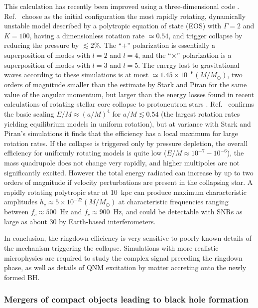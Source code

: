 \documentclass[]{iopart}
\begin{document}
This calculation has recently been improved using a three-dimensional code
\cite{Baiotti:2004wn,Baiotti:2005vi,Baiotti:2006wm,Baiotti:2007np}.
Ref.~\cite{Baiotti:2005vi} choose as the initial configuration the most
rapidly rotating, dynamically unstable model described by a polytropic
equation of state (EOS) with $\Gamma=2$ and $K=100$, having a dimensionless
rotation rate $\simeq 0.54$, and trigger collapse by reducing the pressure by
$\lesssim 2\%$. The ``$+$'' polarization is essentially a superposition of
modes with $l=2$ and $l=4$, and the ``$\times$'' polarization is a
superposition of modes with $l=3$ and $l=5$.  The energy lost to gravitational
waves according to these simulations is at most $\simeq 1.45\times 10^{-6}
(M/M_\odot)$, two orders of magnitude smaller than the estimate by Stark and
Piran for the same value of the angular momentum, but larger than the energy
losses found in recent calculations of rotating stellar core collapse to
protoneutron stars \cite{Mueller:2003fs}. Ref.~\cite{Baiotti:2007np} confirms
the basic scaling $E/M\approx (a/M)^4$ for $a/M\lesssim 0.54$ (the largest
rotation rates yielding equilibrium models in uniform rotation), but at
variance with Stark and Piran's simulations it finds that the efficiency has a
local maximum for large rotation rates.  If the collapse is triggered only by
pressure depletion, the overall efficiency for uniformly rotating models is
quite low ($E/M\approx 10^{-7}-10^{-6}$), the mass quadrupole does not change
very rapidly, and higher multipoles are not significantly excited.  However
the total energy radiated can increase by up to two orders of magnitude if
velocity perturbations are present in the collapsing star.  A rapidly rotating
polytropic star at 10~kpc can produce maximum characteristic amplitudes
$h_c\approx 5\times 10^{-22}(M/M_\odot)$ at characteristic frequencies ranging
between $f_c\approx 500$~Hz and $f_c\approx 900$~Hz, and could be detectable
with SNRs as large as about 30 by Earth-based interferometers.

In conclusion, the ringdown efficiency is very sensitive to poorly known
details of the mechanism triggering the collapse.  Simulations with more
realistic microphysics are required to study the complex signal preceding the
ringdown phase, as well as details of QNM excitation by matter accreting onto
the newly formed BH.

\subsubsection*{\label{sec:mergers}Mergers of compact objects leading to black hole formation}
\end{document}
